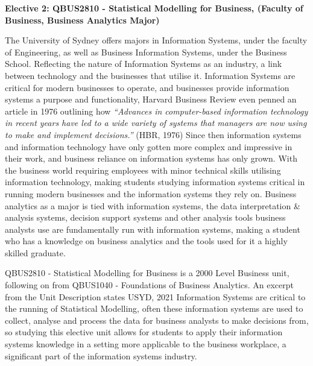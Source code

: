 \textbf{Elective 2: QBUS2810 - Statistical Modelling for Business, (Faculty of Business, Business Analytics Major)}

The University of Sydney offers majors in Information Systems, under the faculty of Engineering, as well as Business Information Systems, under the Business School. Reflecting the nature of Information Systems as an industry, a link between technology and the businesses that utilise it. Information Systems are critical for modern businesses to operate, and businesses provide information systems a purpose and functionality, Harvard Business Review even penned an article in 1976 outlining how \textit{“Advances in computer-based information technology in recent years have led to a wide variety of systems that managers are now using to make and implement decisions.”} (HBR, 1976)  Since then information systems and information technology have only gotten more complex and impressive in their work, and business reliance on information systems has only grown. With the business world requiring employees with minor technical skills utilising information technology, making students studying information systems critical in running modern businesses and the information systems they rely on.  Business analytics as a major is tied with information systems, the data interpretation & analysis systems, decision support systems and other analysis tools business analysts use are fundamentally run with information systems, making a student who has a knowledge on business analytics and the tools used for it a highly skilled graduate.

QBUS2810 - Statistical Modelling for Business is a 2000 Level Business unit, following on from QBUS1040 - Foundations of Business Analytics. An excerpt from the Unit Description states  {USYD, 2021} Information Systems are critical to the running of Statistical Modelling, often these information systems are used to collect, analyse and process the data for business analysts to make decisions from, so studying this elective unit allows for students to apply their information systems knowledge in a setting more applicable to the business workplace, a significant part of the information systems industry. 

